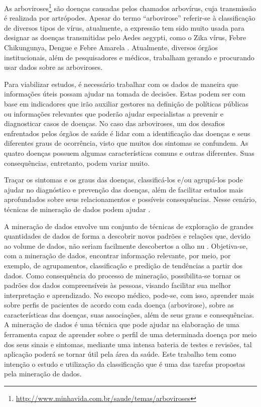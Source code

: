 As arboviroses\footnote{\url{http://www.minhavida.com.br/saude/temas/arboviroses}} são doenças causadas pelos chamados arbovírus, cuja transmissão é realizada por artrópodes. Apesar do termo “arbovirose” referir-se à classificação de diversos tipos de vírus, atualmente, a expressão tem sido muito usada para designar as doenças transmitidas pelo Aedes aegypti, como o Zika vírus, Febre Chikungunya, Dengue e Febre Amarela \cite{IOC2018,CDCP2018}. Atualmente, diversos órgãos institucionais, além de pesquisadores e médicos, trabalham gerando e procurando usar dados sobre as arboviroses.

Para viabilizar estudos, é necessário trabalhar com os dados de maneira que informações úteis possam ajudar na tomada de decisões. Estas podem ser com base em indicadores que irão auxiliar gestores na definição de políticas públicas ou informações relevantes que poderão ajudar especialistas a prevenir e diagnosticar casos de doenças. No caso das arboviroses, um dos desafios enfrentados pelos órgãos de saúde é lidar com a identificação das doenças e seus diferentes graus de ocorrência, visto que muitos dos sintomas se confundem. As quatro doenças possuem algumas características comuns e outras diferentes. Suas consequências, entretanto, podem variar muito. 

Traçar os sintomas e os graus das doenças, classificá-los e/ou agrupá-los pode ajudar no diagnóstico e prevenção das doenças, além de facilitar estudos mais aprofundados sobre seus relacionamentos e possíveis consequências.  Nesse cenário, técnicas de mineração de dados podem ajudar \cite{han2012,Witten2016}.

A mineração de dados envolve um conjunto de técnicas de exploração de grandes quantidades de dados de forma a descobrir novos padrões e relações que, devido ao volume de dados, não seriam facilmente descobertos a olho nu \cite{han2012,Witten2016}. Objetiva-se, com a mineração de dados, encontrar informação relevante, por meio, por exemplo, de agrupamentos, classificação e predição de tendências a partir dos dados. Como consequência do processo de mineração, possibilita-se tornar os padrões dos dados compreensíveis às pessoas, visando facilitar sua melhor interpretação e aprendizado. No escopo médico, pode-se, com isso, aprender mais sobre perfis de pacientes de acordo com cada doença (arbovirose), sobre as características das doenças, suas associações, além de seus graus e consequências. A mineração de dados é uma técnica que pode ajudar na elaboração de uma ferramenta capaz de aprender sobre o perfil de uma determinada doença por meio dos seus sinais e sintomas, mediante uma intensa bateria de testes e revisões, tal aplicação poderá se tornar útil pela área da saúde. Este trabalho tem como intenção o estudo e utilização da classificação que é uma das tarefas propostas pela mineração de dados.


